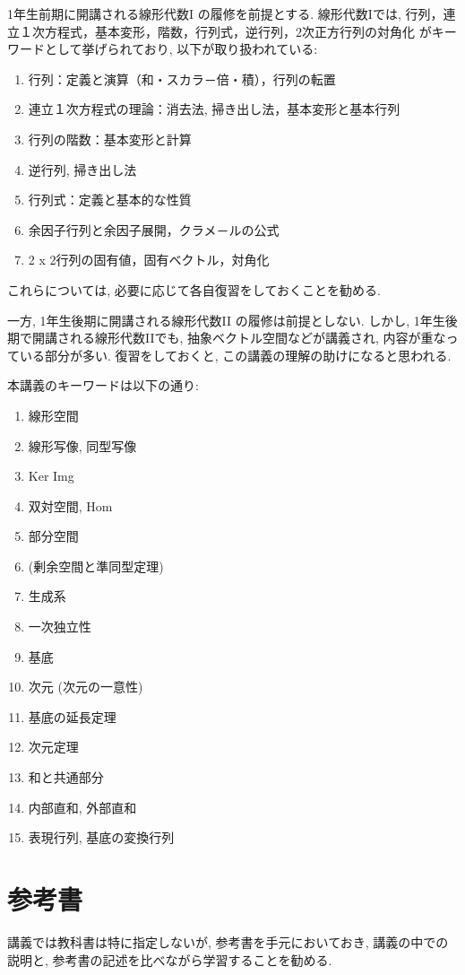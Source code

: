 1年生前期に開講される線形代数I
の履修を前提とする.
線形代数Iでは,
行列，連立１次方程式，基本変形，階数，行列式，逆行列，$2$次正方行列の対角化
がキーワードとして挙げられており,
以下が取り扱われている:
\begin{enumerate}
\item 行列：定義と演算（和・スカラ－倍・積），行列の転置
\item 連立１次方程式の理論：消去法, 掃き出し法，基本変形と基本行列
\item 行列の階数：基本変形と計算
\item 逆行列, 掃き出し法
\item 行列式：定義と基本的な性質
\item 余因子行列と余因子展開，クラメ－ルの公式
\item 2 x 2行列の固有値，固有ベクトル，対角化
\end{enumerate}
これらについては,
必要に応じて各自復習をしておくことを勧める.


一方,
1年生後期に開講される線形代数II
の履修は前提としない.
しかし,
1年生後期で開講される線形代数IIでも,
抽象ベクトル空間などが講義され,
内容が重なっている部分が多い.
復習をしておくと,
この講義の理解の助けになると思われる.

本講義のキーワードは以下の通り:
\begin{enumerate}
\item 線形空間
\item 線形写像, 同型写像
\item Ker Img
\item 双対空間, Hom
\item 部分空間
\item (剰余空間と準同型定理)
\item 生成系
\item 一次独立性
\item 基底
\item 次元 (次元の一意性)
\item 基底の延長定理
\item 次元定理
\item 和と共通部分
\item 内部直和, 外部直和
\item 表現行列, 基底の変換行列
\end{enumerate}

\section{参考書}
講義では教科書は特に指定しないが,
参考書を手元においておき,
講義の中での説明と,
参考書の記述を比べながら学習することを勧める.

